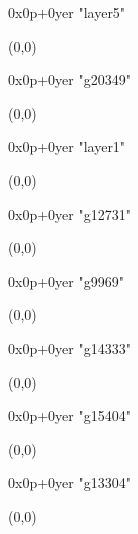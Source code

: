    0x0p+0yer "layer5"
  \begin{textblock}{1}(0,0)
  \end{textblock}

   0x0p+0yer "g20349"
  \begin{textblock}{1}(0,0)
  \end{textblock}

   0x0p+0yer "layer1"
  \begin{textblock}{1}(0,0)
  \end{textblock}

   0x0p+0yer "g12731"
  \begin{textblock}{1}(0,0)
  \end{textblock}

   0x0p+0yer "g9969"
  \begin{textblock}{1}(0,0)
  \end{textblock}

   0x0p+0yer "g14333"
  \begin{textblock}{1}(0,0)
  \end{textblock}

   0x0p+0yer "g15404"
  \begin{textblock}{1}(0,0)
  \end{textblock}

   0x0p+0yer "g13304"
  \begin{textblock}{1}(0,0)
  \end{textblock}
